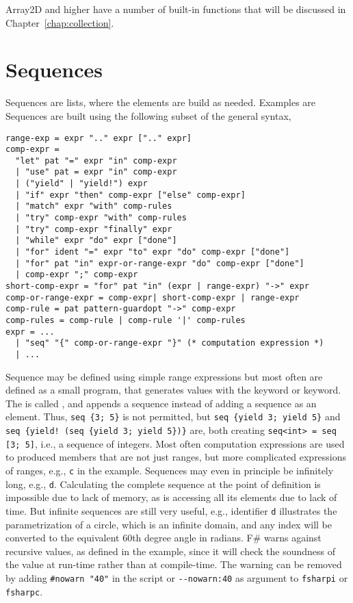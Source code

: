 Array2D and higher have a number of built-in functions that will be discussed in Chapter~\ref{chap:collection}.

\section{Sequences}
\label{sec:sequences}
Sequences are lists, where the elements are build as needed. Examples are
%
%
Sequences are built using the following subset of the general syntax,
\begin{lstlisting}[language=ebnf]
range-exp = expr ".." expr [".." expr]
comp-expr =
  "let" pat "=" expr "in" comp-expr
  | "use" pat = expr "in" comp-expr
  | ("yield" | "yield!") expr
  | "if" expr "then" comp-expr ["else" comp-expr]
  | "match" expr "with" comp-rules
  | "try" comp-expr "with" comp-rules
  | "try" comp-expr "finally" expr
  | "while" expr "do" expr ["done"]
  | "for" ident "=" expr "to" expr "do" comp-expr ["done"]
  | "for" pat "in" expr-or-range-expr "do" comp-expr ["done"]
  | comp-expr ";" comp-expr
short-comp-expr = "for" pat "in" (expr | range-expr) "->" expr
comp-or-range-expr = comp-expr| short-comp-expr | range-expr
comp-rule = pat pattern-guardopt "->" comp-expr
comp-rules = comp-rule | comp-rule '|' comp-rules
expr = ... 
  | "seq" "{" comp-or-range-expr "}" (* computation expression *)
  | ...
\end{lstlisting}
%
Sequence may be defined using simple range expressions but most often are defined as a small program, that generates values with the  keyword or  keyword. The  is called , and appends a sequence instead of adding a sequence as an element. Thus, \lstinline!seq {3; 5}! is not permitted, but \lstinline!seq {yield 3; yield 5}! and \lstinline|seq {yield! (seq {yield 3; yield 5})}| are, both creating \lstinline!seq<int> = seq [3; 5]!, i.e., a sequence of integers. Most often computation expressions are used to produced members that are not just ranges, but more complicated expressions of ranges, e.g., \lstinline!c! in the example. Sequences may even in principle be infinitely long, e.g., \lstinline!d!. Calculating the complete sequence at the point of definition is impossible due to lack of memory, as is accessing all its elements due to lack of time. But infinite sequences are still very useful, e.g., identifier \lstinline!d! illustrates the parametrization of a circle, which is an infinite domain, and any index will be converted to the equivalent 60th degree angle in radians. F\# warns against recursive values, as defined in the example, since it will check the soundness of the value at run-time rather than at compile-time. The warning can be removed by adding \lstinline!#nowarn "40"! in the script or \lstinline!--nowarn:40! as argument to \lstinline[language=console]!fsharpi! or \lstinline[language=console]!fsharpc!.

